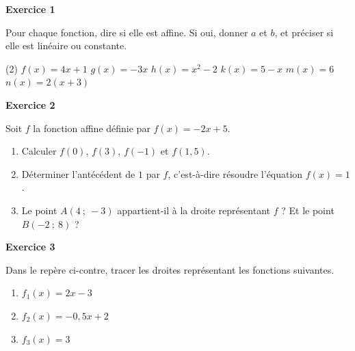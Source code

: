 \documentclass[a4paper,11pt]{article}
\newenvironment{exercice}[1]{%
  \Needspace{6\baselineskip}\par\bigskip\noindent\textbf{Exercice #1}\par\smallskip\noindent\ignorespaces
}{%
  \par
}
\newcommand{\repere}[4]{%
  \draw[very thin, gray!40] (#1,#3) grid (#2,#4);
  \draw[->] (#1,0) -- ({#2+0.4},0) node[below right] {\small $x$};
  \draw[->] (0,#3) -- (0,{#4+0.4}) node[above left] {\small $y$};
  \foreach \x in {#1,...,#2} {\ifnum\x=0\else\draw (\x,0.08) -- (\x,-0.08) node[below] {\scriptsize $\x$};\fi}
  \foreach \y in {#3,...,#4} {\ifnum\y=0\else\draw (0.08,\y) -- (-0.08,\y) node[left] {\scriptsize $\y$};\fi}
  \node[below left] at (0,0) {\scriptsize $0$};
}
\begin{document}
\pagestyle{fancy}

\fancyhf{} %
\fancyhead[L]{ {\Niveau}}
\fancyhead[C]{ {\Chapitre}}
\fancyhead[R]{ {\Document}}
\fancyfoot[R]{{\thepage\  / \pageref{LastPage}}}

\begin{exercice}{1}
Pour chaque fonction, dire si elle est affine. Si oui, donner $a$ et $b$, et préciser si elle est linéaire ou constante.
\begin{tasks}(2)
\task $f(x)=4x+1$
\task $g(x)=-3x$
\task $h(x)=x^2-2$
\task $k(x)=5-x$
\task $m(x)=6$
\task $n(x)=2(x+3)$
\end{tasks}
\end{exercice}

\begin{exercice}{2}
Soit $f$ la fonction affine définie par $f(x)=-2x+5$.
\begin{enumerate}[label=\arabic*.]
\item Calculer $f(0)$, $f(3)$, $f(-1)$ et $f(1{,}5)$.
\item Déterminer l'antécédent de $1$ par $f$, c'est-à-dire résoudre l'équation $f(x)=1$.
\item Le point $A(4~;~-3)$ appartient-il à la droite représentant $f$ ? Et le point $B(-2~;~8)$ ?
\end{enumerate}
\end{exercice}

\begin{exercice}{3}
\begin{minipage}[c]{0.5\linewidth}
Dans le repère ci-contre, tracer les droites représentant les fonctions suivantes.
\begin{enumerate}[label=\arabic*.]
\item $f_1(x)=2x-3$
\item $f_2(x)=-0{,}5x+2$
\item $f_3(x)=3$
\end{enumerate}
\end{minipage}
\hfill
\begin{minipage}[c]{0.46\linewidth}
\centering
{}
\end{minipage}
\end{exercice}
\end{document}
